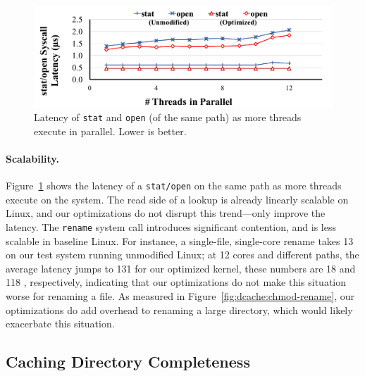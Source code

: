 \begin{figure}[t!]
\footnotesize
\centering
\includegraphics[width=5.5in]{dcache/plots/stat-open-scal.pdf}
\vspace{-5pt}
\caption[The optimized {\tt stat} and {\tt open} latency when called in parallel.]
{Latency of {\tt stat} and {\tt open} (of the same path) as more threads execute in parallel.  Lower is better.}
\label{fig:dcache:scalability}
\end{figure}



\paragraph{Scalability.}
Figure~\ref{fig:dcache:scalability} shows the latency of a {\tt stat/open} on the same path as more threads execute on the system.  
The read side of a lookup is already linearly scalable on Linux, and our optimizations do not disrupt this trend---only improve the latency.
The {\tt rename} system call introduces significant contention, and is less scalable in baseline Linux.
For instance, a single-file, single-core rename takes 13 \us{} 
on our test system running unmodified Linux; 
at 12 cores and different paths, the average latency jumps to 131 \us{}
for our optimized kernel, these numbers are 18 and 118 \us{}, respectively, indicating that 
our optimizations do not make this situation worse for renaming a file.
As measured in Figure~\ref{fig:dcache:chmod-rename},
our optimizations do add overhead to renaming a large directory, which would likely exacerbate this situation.

\subsection{Caching Directory Completeness}

